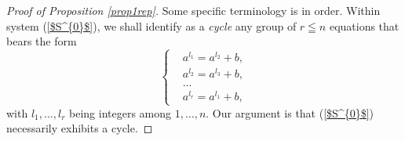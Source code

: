 \documentclass[pdflatex,sn-apa,11pt]{sn-jnl}%
\begin{document}
\begin{proof}[Proof of Proposition \ref{prop1rep}]

Some specific terminology is in order. Within system (\ref{$S^{0}$}), we shall identify as a \textit{cycle} any group of $r \leqq n$ equations that bears the form
\begin{equation*}
  \left\{
    \begin{aligned}
      & a^{l_1} = a^{l_2} + b, \\
      & a^{l_2} = a^{l_3} + b, \\
      & \dots \\
      & a^{l_r} = a^{l_1} + b,
    \end{aligned}
  \right.
\end{equation*} 
with $l_1, \dots, l_r$ being integers among $1, \dots, n$. Our argument is that (\ref{$S^{0}$}) necessarily exhibits a cycle. 


\end{proof}
\end{document}
